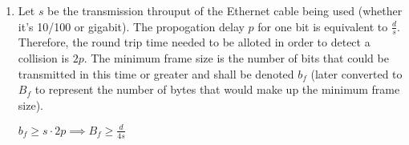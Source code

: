 \begin{enumerate}
    \newpage

    \item Let $s$ be the transmission throuput of the Ethernet cable being used (whether it's 10/100 or gigabit). The propogation delay $p$ for one bit is equivalent to $\frac{d}{s}$. Therefore, the round trip time needed to be alloted in order to detect a collision is $2p$. The minimum frame size is the number of bits that could be transmitted in this time or greater and shall be denoted $b_f$ (later converted to $B_f$ to represent the number of bytes that would make up the minimum frame size).
    \begin{center}
        $b_f  \geq s \cdot 2p \implies B_f \geq \frac{d}{4s}$
    \end{center}
\end{enumerate}


